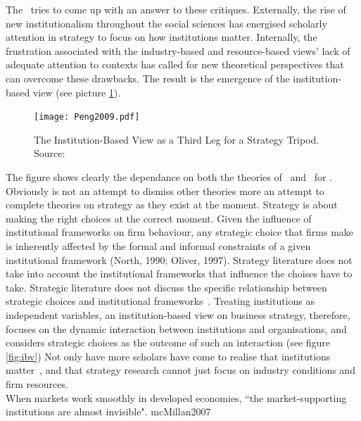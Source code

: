 The \ibv~tries to come up with an answer to these critiques. 
Externally, the rise of new institutionalism throughout the social sciences has energised scholarly attention in strategy to focus on how institutions matter. Internally, the frustration associated with the industry-based and resource-based views’ lack of adequate attention to contexts has called for new theoretical perspectives that can overcome these drawbacks. 
The result is the emergence of the institution-based view \cite{Peng:2009} (see picture \ref{fig:ibv2}).


\begin{figure}[htbp!] 
	\centering
	\texttt{[image: Peng2009.pdf]}
 	\caption{The Institution-Based View as a Third Leg for a Strategy Tripod. Source: \cite{Peng:2009}}
	\label{fig:ibv2}
\end{figure}

The figure shows clearly the dependance on both the theories of~\cite{Barney:2001} and~\cite{Porter:1980} for \ibv. Obviously \ibv is not an attempt to dismiss other theories more an attempt to complete theories on strategy as they exist at the moment. Strategy is about making the right choices at the correct moment. 
Given the influence of institutional frameworks on firm behaviour, any strategic choice that firms make is inherently affected by the formal and informal constraints of a given institutional framework (North, 1990; Oliver, 1997). Strategy literature does not take into account the institutional frameworks that influence the choises \mne have to take. Strategic literature does not discuss the specific relationship between strategic choices and institutional frameworks~\cite{Peng:2008}.
Treating institutions as independent variables, an institution-based view on business strategy, therefore, focuses on the dynamic interaction between institutions and organisations, and considers strategic choices as the outcome of such an interaction (see figure \ref{fig:ibv})\cite{Peng:2002}
Not only have more scholars have come to realise that institutions matter~\cite{Powell:1991,Scott:1995}, and that strategy research cannot just focus on industry conditions and firm resources.\\


When markets work smoothly in developed economies, ``the market-supporting institutions are almost invisible". mcMillan2007









